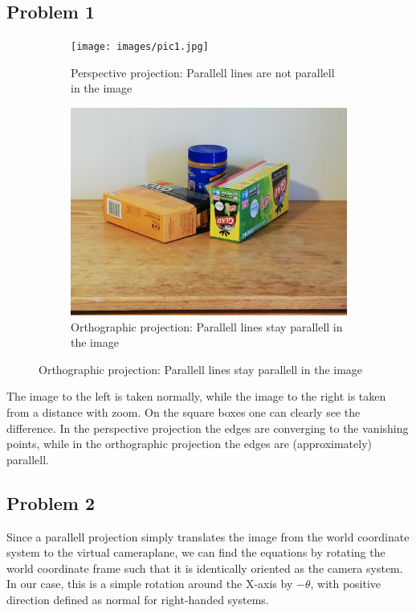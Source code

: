 \documentclass{article}
\begin{document}
\subsection*{Problem 1}

\begin{figure}[h!]
	\centering
	\begin{subfigure}{0.4\linewidth}
		\texttt{[image: images/pic1.jpg]}
		\caption{Perspective projection: Parallell lines are not parallell in the image}
	\end{subfigure}
	\begin{subfigure}{0.4\linewidth}
		\includegraphics[width=\linewidth]{images/pic2.jpg}
		\caption{Orthographic projection: Parallell lines stay parallell in the image}
	\end{subfigure}
\end{figure}
The image to the left is taken normally, while the image to the right is taken from a distance with zoom. On the square boxes one can clearly see the difference. In the perspective projection the edges are converging to the vanishing points, while in the orthographic projection the edges are (approximately) parallell.


\subsection*{Problem 2}

Since a parallell projection simply translates the image from the world coordinate system to the virtual cameraplane, we can find the equations by rotating the world coordinate frame such that it is identically oriented as the camera system. In our case, this is a simple rotation around the X-axis by $-\theta$, with positive direction defined as normal for right-handed systems.
\end{document}
